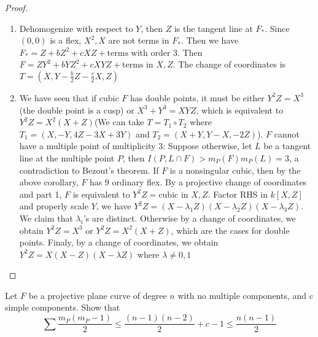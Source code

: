 \documentclass{solution}
\begin{document}
\begin{proof}
    \begin{enumerate}
        \item Dehomogenize with respect to $Y$, then $Z$ is the tangent line at $F_*$. Since $(0, 0)$ is a flex, $X^2, X$ are not terms in $F_*$. Then we have $F_* = Z + bZ^2 + cXZ + \text{terms with order $3$}$. Then $F = ZY^2 + bYZ^2 + cXYZ + \text{terms in $X, Z$}$. The change of coordinates is $T = (X, Y - \frac{b}{2} Z - \frac{c}{2}X, Z)$
        \item We have seen that if cubic $F$ has double points, it must be either $Y^2Z = X^3$ (the double point is a cusp) or $X^3 + Y^3 = XYZ$, which is equivalent to $Y^2Z = X^2(X + Z)$(We can take $T = T_1 \circ T_2$ where $T_1 = (X, -Y, 4Z - 3X + 3Y)$ and $T_2 = (X + Y, Y - X, -2Z)$). $F$ cannot have a multiple point of multiplicity $3$: Suppose otherwise, let $L$ be a tangent line at the multiple point $P$, then $I(P, L \cap F) \gt m_P(F)m_P(L) = 3$, a contradiction to Bezout's theorem. If $F$ is a nonsingular cubic, then by the above corollary, $F$ has $9$ ordinary flex. By a projective change of coordinates and part 1, $F$ is equivalent to $Y^2Z = \text{cubic in $X, Z$}$. Factor RHS in $k[X, Z]$ and properly scale $Y$, we have $Y^2Z = (X - \lambda_1 Z)(X - \lambda_2Z)(X - \lambda_3Z)$. We claim that $\lambda_i$'s are distinct. Otherwise by a change of coordinates, we obtain $Y^2Z = X^3$ or $Y^2Z = X^2(X + Z)$, which are the cases for double points. Finaly, by a change of coordinates, we obtain $Y^2Z = X(X - Z)(X - \lambda Z)$ where $\lambda \ne 0, 1$
    \end{enumerate}
\end{proof}

\begin{problem}{5.25}
    Let $F$ be a projective plane curve of degree $n$ with no multiple components, and $c$ simple components. Show that
    $$\sum \frac{m_P(m_P - 1)}{2} \le \frac{(n - 1)(n - 2)}{2} + c - 1 \le \frac{n(n - 1)}{2}$$
\end{problem}
\end{document}
